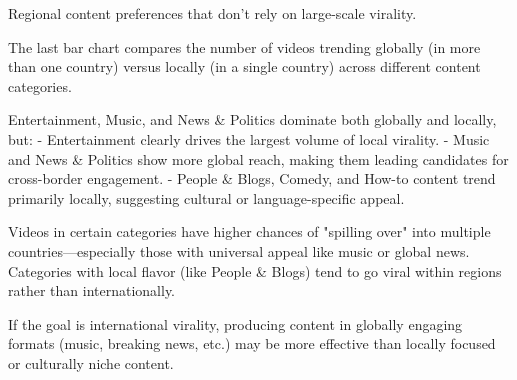 \documentclass[a4paper]{article}
\begin{document}
\begin{multicols}{2}
Regional content preferences that don’t rely on large-scale virality.






The last bar chart compares the number of videos trending globally (in more than one country) versus locally (in a single country) across different content categories.

Entertainment, Music, and News \& Politics dominate both globally and locally, but:
- Entertainment clearly drives the largest volume of local virality.
- Music and News \& Politics show more global reach, making them leading candidates for cross-border engagement.
- People \& Blogs, Comedy, and How-to content trend primarily locally, suggesting cultural or language-specific appeal.

Videos in certain categories have higher chances of "spilling over" into multiple countries—especially those with universal appeal like music or global news.
Categories with local flavor (like People \& Blogs) tend to go viral within regions rather than internationally.

If the goal is international virality, producing content in globally engaging formats (music, breaking news, etc.) may be more effective than locally focused or culturally niche content.\





\end{multicols}
\end{document}
